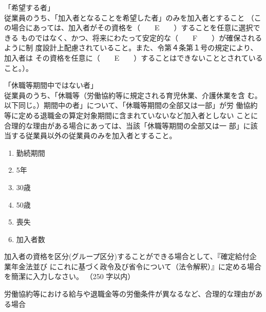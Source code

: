 \begin{fillblank}[数理人試験 \ H28 \ 問題1 \ 設問2]
\begin{lawstructure}
\begin{lawarticle}{}{}
      「希望する者」\\      \hspace*{1.0em}%
      従業員のうち、「加入者となることを希望した者」のみを加入者とすること
      （この場合にあっては、加入者がその資格を（　　E　　）することを任意に選択できる
      ものではなく、かつ、将来にわたって安定的な（　　F　　）が確保されるように制
      度設計上配慮されていること。また、令第４条第１号の規定により、加入者は
      その資格を任意に（　　E　　）することはできないこととされていること。）。

      「休職等期間中ではない者」\\      \hspace*{1.0em}%
      従業員のうち、「休職等（労働協約等に規定される育児休業、介護休業を含
      む。以下同じ。）期間中の者」について、「休職等期間の全部又は一部」が労
      働協約等に定める退職金の算定対象期間に含まれていないなど加入者としない
      ことに合理的な理由がある場合にあっては、当該「休職等期間の全部又は一
      部」に該当する従業員以外の従業員のみを加入者とすること。

    \end{lawarticle}
  \end{lawstructure}
\end{fillblank}

\begin{answerbox}
  \begin{enumerate}[A:]
    \item 勤続期間
    \item 5年
    \item 30歳
    \item 50歳
    \item 喪失
    \item 加入者数
  \end{enumerate}
\end{answerbox}

\begin{shortanswer}[年金1 \ 2023 \ 問題2(1)ウ]
  加入者の資格を区分(グループ区分)することができる場合として、『確定給付企業年金法並び
にこれに基づく政令及び省令について（法令解釈）』に定める場合を簡潔に入力しなさい。
（250 字以内）
\end{shortanswer}

\begin{answerbox}
  労働協約等における給与や退職金等の労働条件が異なるなど、合理的な理由がある場合
\end{answerbox}

